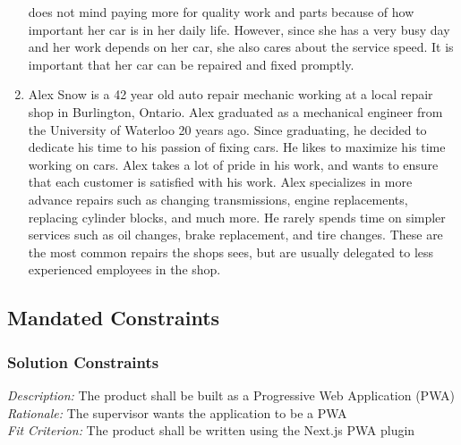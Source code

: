 \documentclass[12pt]{article}
\begin{document}
\begin{enumerate}
	      does not mind paying more for quality work and parts because of how important her car is in her
	      daily life. However, since she has a very busy day and her work depends on her car, she also cares
	      about the service speed. It is important that her car can be repaired and fixed promptly.
	\item Alex Snow is a 42 year old auto repair mechanic working at a local repair shop in Burlington,
	      Ontario. Alex graduated as a mechanical engineer from the University of Waterloo 20 years ago.
	      Since graduating, he decided to dedicate his time to his passion of fixing cars. He likes to
	      maximize his time working on cars. Alex takes a lot of pride in his work, and wants to ensure that
	      each customer is satisfied with his work. Alex specializes in more advance repairs such as changing
	      transmissions, engine replacements, replacing cylinder blocks, and much more. He rarely spends time
	      on simpler services such as oil changes, brake replacement, and tire changes. These are the most
	      common repairs the shops sees, but are usually delegated to less experienced employees in the shop.
\end{enumerate}
\subsection{Mandated Constraints}

\subsubsection{Solution Constraints}
\emph{Description:} The product shall be built as a Progressive Web Application (PWA)\\
\emph{Rationale:} The supervisor wants the application to be a PWA\\
\emph{Fit Criterion:} The product shall be written using the Next.js PWA plugin
\end{document}
